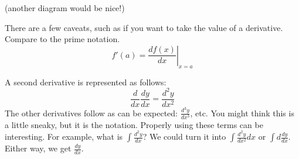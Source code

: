 \documentclass[12pt]{article}
\begin{document}
(another diagram would be nice!)

There are a few caveats, such as if you want to take the value of a
derivative. Compare to the prime notation.
$$ f'(a) = \left. \frac{df(x)}{dx} \right |_{x=a} $$

A second derivative is represented as follows:
$$ \frac{d}{dx} \frac{dy}{dx} = \frac{d^2y}{dx^2} $$
The other derivatives follow as can be expected: $\frac{d^3y}{dx^3}$, etc.
You might think this is a little sneaky, but it is the notation. Properly using
these terms can be interesting. For example, what is $\int \frac{d^2y}{dx} $? We
could turn it into $\int \frac{d^2y}{dx^2} dx$ or $\int d\frac{dy}{dx} $.
Either way, we get $\frac{dy}{dx}$.
\end{document}

